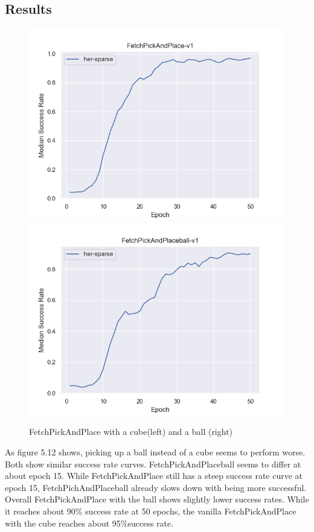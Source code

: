 \subsection{Results}

\begin{figure} [h]
	
	\centering
	\includegraphics[width=1\textwidth]{figures/fig_FetchPickAndPlace-v1.png}
	\includegraphics[width=1\textwidth]{figures/fig_FetchPickAndPlaceball-v1.png}
	\caption{FetchPickAndPlace with a cube(left) and a ball (right)}
	
\end{figure}

As figure 5.12 shows, picking up a ball instead of a cube seems to perform worse. Both show similar success rate curves. FetchPickAndPlaceball seems to differ at about epoch 15. While FetchPickAndPlace still has a steep success rate curve at epoch 15, FetchPichAndPlaceball already slows down with being more successful. Overall FetchPickAndPlace with the ball shows slightly lower success rates. While it reaches about 90\% success rate at 50 epochs, the vanilla FetchPickAndPlace with the cube reaches about 95\%success rate.

